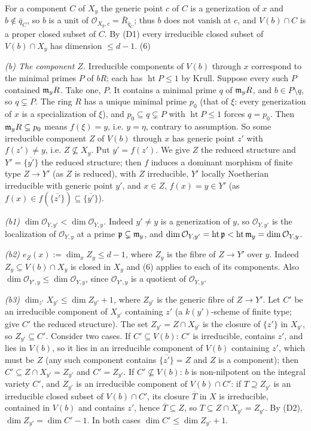 \documentclass[11pt]{article}
\begin{document}
For a component $C$ of $X_y$ the generic point $c$ of $C$ is a generization of $x$ and $b\notin\bar q_C$, so $b$ is a unit of $\mathcal O_{X_y,c}=\bar R_{\bar q_C}$; thus $b$ does not vanish at $c$, and $V(b)\cap C$ is a proper closed subset of $C$. By (D1) every irreducible closed subset of $V(b)\cap X_y$ has dimension $\le d-1$. (6)

\emph{(b) The component $Z$.} Irreducible components of $V(b)$ through $x$ correspond to the minimal primes $P$ of $bR$; each has $\operatorname{ht}P\le1$ by Krull. Suppose every such $P$ contained $\mathfrak m_yR$. Take one, $P$. It contains a minimal prime $q$ of $\mathfrak m_yR$, and $b\in P\setminus q$, so $q\subsetneq P$. The ring $R$ has a unique minimal prime $p_0$ (that of $\xi$: every generization of $x$ is a specialization of $\xi$), and $p_0\subseteq q\subsetneq P$ with $\operatorname{ht}P\le1$ forces $q=p_0$. Then $\mathfrak m_yR\subseteq p_0$ means $f(\xi)=y$, i.e. $y=\eta$, contrary to assumption. So some irreducible component $Z$ of $V(b)$ through $x$ has generic point $z'$ with $f(z')\neq y$, i.e. $Z\not\subseteq X_y$. Put $y'=f(z')$. We give $Z$ the reduced structure and $Y'=\overline{\{y'\}}$ the reduced structure; then $f$ induces a dominant morphism of finite type $Z\to Y'$ (as $Z$ is reduced), with $Z$ irreducible, $Y'$ locally Noetherian irreducible with generic point $y'$, and $x\in Z$, $f(x)=y\in Y'$ (as $f(x)\in f(\overline{\{z'\}})\subseteq\overline{\{y'\}}$).

\emph{(b1) $\dim\mathcal O_{Y,y'}<\dim\mathcal O_{Y,y}$.} Indeed $y'\neq y$ is a generization of $y$, so $\mathcal O_{Y,y'}$ is the localization of $\mathcal O_{Y,y}$ at a prime $\mathfrak p\subsetneq\mathfrak m_y$, and $\dim\mathcal O_{Y,y'}=\operatorname{ht}\mathfrak p<\operatorname{ht}\mathfrak m_y=\dim\mathcal O_{Y,y}$.

\emph{(b2) $e_Z(x):=\dim_xZ_y\le d-1$,} where $Z_y$ is the fibre of $Z\to Y'$ over $y$. Indeed $Z_y\subseteq V(b)\cap X_y$ is closed in $X_y$ and (6) applies to each of its components. Also $\dim\mathcal O_{Y',y}\le\dim\mathcal O_{Y,y}$, since $\mathcal O_{Y',y}$ is a quotient of $\mathcal O_{Y,y}$.

\emph{(b3) $\dim_{z'}X_{y'}\le\dim Z_{y'}+1$,} where $Z_{y'}$ is the generic fibre of $Z\to Y'$. Let $C'$ be an irreducible component of $X_{y'}$ containing $z'$ (a $k(y')$-scheme of finite type; give $C'$ the reduced structure). The set $Z_{y'}=Z\cap X_{y'}$ is the closure of $\{z'\}$ in $X_{y'}$, so $Z_{y'}\subseteq C'$. Consider two cases. If $C'\subseteq V(b)$: $C'$ is irreducible, contains $z'$, and lies in $V(b)$, so it lies in an irreducible component of $V(b)$ containing $z'$, which must be $Z$ (any such component contains $\overline{\{z'\}}=Z$ and $Z$ is a component); then $C'\subseteq Z\cap X_{y'}=Z_{y'}$ and $C'=Z_{y'}$. If $C'\not\subseteq V(b)$: $b$ is non-nilpotent on the integral variety $C'$, and $Z_{y'}$ is an irreducible component of $V(b)\cap C'$: if $T\supseteq Z_{y'}$ is an irreducible closed subset of $V(b)\cap C'$, its closure $\overline T$ in $X$ is irreducible, contained in $V(b)$ and contains $z'$, hence $\overline T\subseteq Z$, so $T\subseteq Z\cap X_{y'}=Z_{y'}$. By (D2), $\dim Z_{y'}=\dim C'-1$. In both cases $\dim C'\le\dim Z_{y'}+1$.
\end{document}
